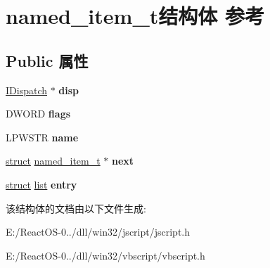 \hypertarget{structnamed__item__t}{}\section{named\+\_\+item\+\_\+t结构体 参考}
\label{structnamed__item__t}
\subsection*{Public 属性}
\begin{DoxyCompactItemize}
\item 
\mbox{\label{structnamed__item__t_afbac498bb612090d64eed4344cf6c509}} 
\hyperlink{interface_i_dispatch}{I\+Dispatch} $\ast$ {\bfseries disp}
\item 
\mbox{\label{structnamed__item__t_aea8db0c32d032e03c8b32e4d0b0f5e25}} 
D\+W\+O\+RD {\bfseries flags}
\item 
\mbox{\label{structnamed__item__t_ade6e56f72da994ba37b1d5a41890d4fd}} 
L\+P\+W\+S\+TR {\bfseries name}
\item 
\mbox{\label{structnamed__item__t_a8ed21cb5bef0709d0aa04bf0863e60b2}} 
\hyperlink{interfacestruct}{struct} \hyperlink{structnamed__item__t}{named\+\_\+item\+\_\+t} $\ast$ {\bfseries next}
\item 
\mbox{\label{structnamed__item__t_a6ca20167ddd9d85737e3df63ccd5c8b8}} 
\hyperlink{interfacestruct}{struct} \hyperlink{classlist}{list} {\bfseries entry}
\end{DoxyCompactItemize}


该结构体的文档由以下文件生成\+:\begin{DoxyCompactItemize}
\item 
E\+:/\+React\+O\+S-\/0../dll/win32/jscript/jscript.\+h\item 
E\+:/\+React\+O\+S-\/0../dll/win32/vbscript/vbscript.\+h\end{DoxyCompactItemize}
